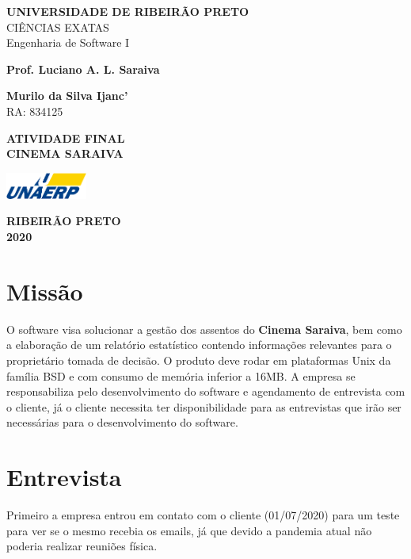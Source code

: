 \documentclass[12pt,a4paper]{article}
\let\oldsection\section
\renewcommand\section{\clearpage\oldsection}
\begin{document}
\begin{titlepage}
	\begin{center}
		\textbf{UNIVERSIDADE DE RIBEIRÃO PRETO} \\
			CIÊNCIAS EXATAS \\
			Engenharia de Software I

			\vspace{1.5cm}

			\textbf{Prof. Luciano A. L. Saraiva}
			\vspace{0.5cm}

			\textbf{Murilo da Silva Ijanc'} \\
			RA: 834125

			\vspace{6.5cm}

			\textbf{ATIVIDADE FINAL} \\
			\textbf{CINEMA SARAIVA}

			\vfill

			\vspace{0.8cm}

			\includegraphics[width=0.2\textwidth]{unaerp}

			\textbf{RIBEIRÃO PRETO} \\
			\textbf{2020}
	\end{center}
\end{titlepage}


\thispagestyle{empty}

\tableofcontents


\section{Missão}
O software visa solucionar a gestão dos assentos do \textbf{Cinema Saraiva}, bem
como a elaboração de um relatório estatístico contendo informações relevantes para
o proprietário tomada de decisão. O produto deve rodar em plataformas Unix da família
BSD e com consumo de memória inferior a 16MB. A empresa se responsabiliza pelo
desenvolvimento do software e agendamento de entrevista com o cliente, já o cliente
necessita ter disponibilidade para as entrevistas que irão ser necessárias para o 
desenvolvimento do software.

\section{Entrevista}
Primeiro a empresa entrou em contato com o cliente (01/07/2020) para um teste para ver se o
mesmo recebia os emails, já que devido a pandemia atual não poderia realizar
reuniões física.
\end{document}
